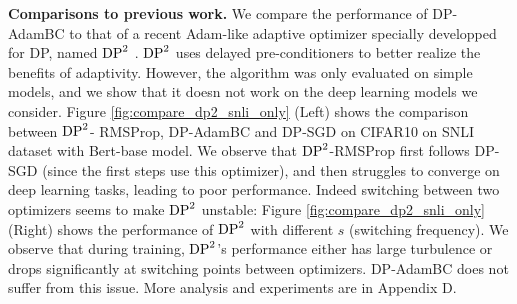 \documentclass[letterpaper]{article} %
\begin{document}
{\bf Comparisons to previous work.} We compare the performance of DP-AdamBC to that of a recent Adam-like adaptive optimizer specially developped for DP, named $\textnormal{DP}^{2}$ \citep{lidp2}. $\textnormal{DP}^{2}$ uses delayed pre-conditioners to better realize the benefits of adaptivity. However, the algorithm was only evaluated on simple models, and we show that it doesn not work on the deep learning models we consider. Figure \ref{fig:compare_dp2_snli_only} (Left) shows the comparison between $\textnormal{DP}^{2}$-
RMSProp, DP-AdamBC and DP-SGD on CIFAR10 on SNLI dataset with Bert-base model. We observe that $\textnormal{DP}^{2}$-RMSProp first follows DP-SGD (since the first steps use this optimizer), and then struggles to converge on deep learning tasks, leading to poor performance. Indeed switching between two optimizers seems to make $\textnormal{DP}^{2}$ unstable: Figure \ref{fig:compare_dp2_snli_only} (Right) shows the performance of $\textnormal{DP}^{2}$ with different $s$ (switching frequency). We observe that during training, $\textnormal{DP}^{2}$'s performance either has large turbulence or drops significantly at switching points between optimizers. DP-AdamBC does not suffer from this issue. More analysis and experiments are in Appendix D.
\end{document}

